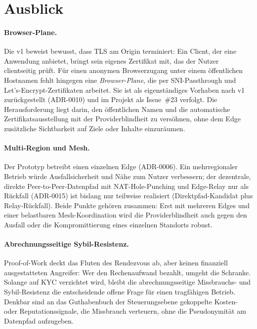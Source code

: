 \section{Ausblick}
\label{sec:ausblick}

\paragraph{Browser-Plane.} Die v1 beweist bewusst, dass TLS am Origin
terminiert: Ein Client, der eine Anwendung anbietet, bringt sein eigenes
Zertifikat mit, das der Nutzer clientseitig prüft. Für einen anonymen
Browserzugang unter einem öffentlichen Hostnamen fehlt hingegen eine
\emph{Browser-Plane}, die per SNI-Passthrough und Let's-Encrypt-Zertifikaten
arbeitet. Sie ist als eigenständiges Vorhaben nach v1 zurückgestellt (ADR-0010)
und im Projekt als Issue~\#23 verfolgt. Die Herausforderung liegt darin, den
öffentlichen Namen und die automatische Zertifikatsausstellung mit der
Providerblindheit zu versöhnen, ohne dem Edge zusätzliche Sichtbarkeit auf Ziele
oder Inhalte einzuräumen.

\paragraph{Multi-Region und Mesh.} Der Prototyp betreibt einen einzelnen
Edge (ADR-0006). Ein mehrregionaler Betrieb würde Ausfallsicherheit und Nähe zum
Nutzer verbessern; der dezentrale, direkte Peer-to-Peer-Datenpfad mit
NAT-Hole-Punching und Edge-Relay nur als Rückfall (ADR-0015) ist bislang nur
teilweise realisiert (Direktpfad-Kandidat plus Relay-Rückfall). Beide Punkte
gehören zusammen: Erst mit mehreren Edges und einer belastbaren Mesh-Koordination
wird die Providerblindheit auch gegen den Ausfall oder die Kompromittierung eines
einzelnen Standorts robust.

\paragraph{Abrechnungsseitige Sybil-Resistenz.} Proof-of-Work deckt das Fluten
des Rendezvous ab, aber keinen finanziell ausgestatteten Angreifer: Wer den
Rechenaufwand bezahlt, umgeht die Schranke. Solange auf KYC verzichtet wird,
bleibt die abrechnungsseitige Missbrauchs- und Sybil-Resistenz die
entscheidende offene Frage für einen tragfähigen Betrieb. Denkbar sind an das
Guthabenbuch der Steuerungsebene gekoppelte Kosten- oder Reputationssignale, die
Missbrauch verteuern, ohne die Pseudonymität am Datenpfad aufzugeben.

